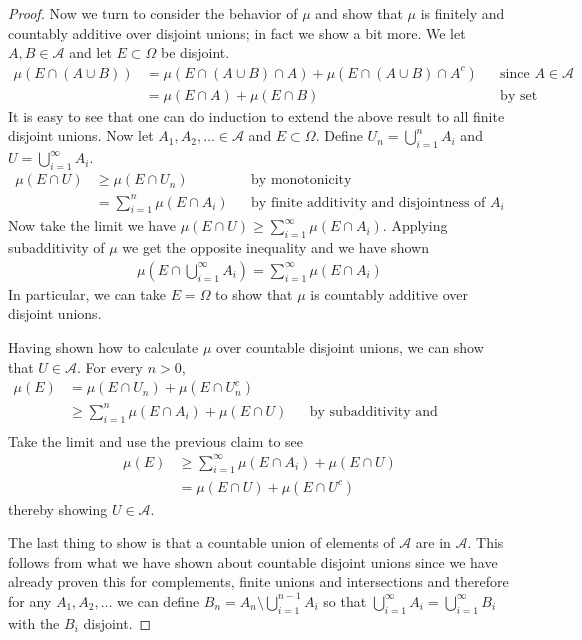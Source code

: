 \documentclass{amsart}
\theoremstyle{remark}
\theoremstyle{definition}
\begin{document}
\begin{proof}
Now we turn to consider the behavior of $\mu$ and show that $\mu$ is
finitely and countably additive over disjoint unions; in fact we show
a bit more.
We let $A,B \in \mathcal{A}$ and let $E \subset \Omega$
be disjoint.
\begin{align*}
\mu(E \cap (A \cup B)) &= \mu(E \cap (A \cup B) \cap A) + \mu(E \cap
(A \cup B) \cap A^c) & & \text{since $A \in \mathcal{A}$} \\
&= \mu(E \cap A) + \mu(E \cap B) & &\text{by set algebra}
\end{align*}
It is easy to see that one can do induction to extend the above result
to all finite disjoint unions.
Now let $A_1, A_2, \dots \in \mathcal{A}$ and $E \subset \Omega$.
Define $U_n = \bigcup_{i=1}^n A_i$ and $U = \bigcup_{i=1}^\infty A_i$.
\begin{align*}
\mu(E \cap U) &\geq \mu(E \cap U_n) & & \text{by monotonicity} \\
&= \sum_{i=1}^n \mu(E \cap A_i) & &\text{by finite additivity and
  disjointness of $A_i$}
\end{align*}
Now take the limit we have $\mu(E \cap U) \geq \sum_{i=1}^\infty \mu(E
\cap A_i)$.  Applying subadditivity of $\mu$ we get the opposite
inequality and we have shown 
\begin{align*}
\mu(E \cap \bigcup_{i=1}^\infty A_i) = \sum_{i=1}^\infty \mu(E
\cap A_i)
\end{align*}
In particular, we can take $E=\Omega$ to show that $\mu$ is countably
additive over disjoint unions.

Having shown how to calculate $\mu$ over countable disjoint unions, we
can show that $U \in \mathcal{A}$. For every $n > 0$,
\begin{align*}
\mu(E) &= \mu(E \cap U_n) + \mu(E \cap U_n^c) \\
&\geq \sum_{i=1}^n \mu(E \cap A_i) + \mu(E \cap U) & & \text{by
  subadditivity and monotonicity} \\
\end{align*}
Take the limit and use the previous claim to see
\begin{align*}
\mu(E) &\geq \sum_{i=1}^\infty \mu(E \cap A_i) + \mu(E \cap U) \\
&= \mu(E \cap U) + \mu(E \cap U^c)
 \end{align*}
thereby showing $U \in \mathcal{A}$.

The last thing to show is that a countable union of elements of
$\mathcal{A}$ are in $\mathcal{A}$.  This follows from what we have
shown about countable
disjoint unions since we have already proven this for complements, finite unions
and intersections and therefore for any $A_1,A_2, \dots$ we can define
$B_n = A_n \setminus \bigcup_{i=1}^{n-1} A_i$ so that
$\bigcup_{i=1}^\infty A_i =\bigcup_{i=1}^\infty B_i$ with the $B_i$ disjoint.
\end{proof}
\end{document}
